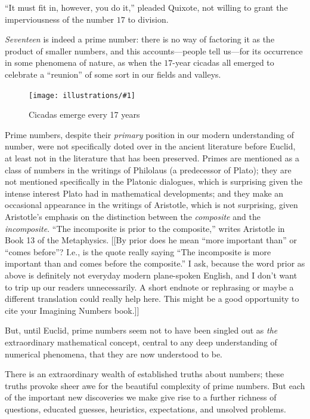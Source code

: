\documentclass[11pt,draft]{article}
\newcommand{\ill}[3]{ 
   \begin{figure}[H]
   \begin{center}
   \texttt{[image: illustrations/\#1]}
   \caption{#3}
   \end{center}
    \end{figure}
}
\theoremstyle{plain}
\theoremstyle{definition}
\numberwithin{equation}{section}
\numberwithin{figure}{section}
\numberwithin{table}{section}
\begin{document}
``It must fit in, however, you do it,'' pleaded Quixote, not willing to
grant the imperviousness of the number $17$ to division.


\bigskip


{\em Seventeen} is indeed a prime number: there is no way of factoring
it as the product of smaller numbers, and this accounts---people tell
us---for its occurrence in some phenomena of nature, as when
the $17$-year cicadas all emerged to celebrate a ``reunion'' of some
sort in our fields and valleys.

\ill{cicada}{.3}{Cicadas emerge every 17 years}

\bigskip


Prime numbers, despite their {\em primary} position in our modern
understanding of number, were not specifically doted over in the
ancient literature before Euclid, at least not in the literature that
has been preserved. Primes are mentioned as a class of numbers in the
writings of Philolaus (a predecessor of Plato); they are not mentioned
specifically in the Platonic dialogues, which is surprising 
given the intense interest Plato had in mathematical developments; and
they make an occasional appearance in the writings of Aristotle, which
is not surprising, given Aristotle's emphasis on the distinction
between the {\em composite} and the {\em incomposite}. ``The
incomposite is prior to the composite,'' writes Aristotle in Book 13 of
the Metaphysics.
[[By prior does he mean ``more important than'' or ``comes before''?  I.e., is the quote
really saying ``The incomposite is more important than and comes before the composite.''
I ask, because the word prior as above is definitely not everyday modern
plane-spoken English, and I don't want to trip up our readers unnecessarily.  A
short endnote or rephrasing or maybe a different translation could really help here.
This might be a good opportunity to cite your Imagining Numbers book.]]
           
\bigskip


But, until Euclid, prime numbers seem not to have been singled out as
{\em the} extraordinary mathematical concept, central to any deep
understanding of numerical phenomena, that they are now understood to
be.
       
\bigskip


There is an extraordinary wealth of established truths about numbers;
these truths provoke sheer awe for the beautiful complexity of prime
numbers. But each of the important new discoveries we make give rise
to a further richness of questions, educated guesses, heuristics,
expectations, and unsolved problems.
            
\end{document}

